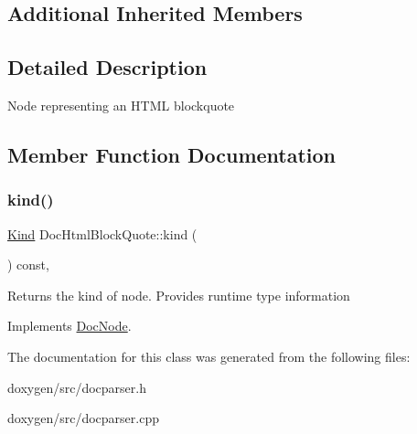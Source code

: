 \subsection*{Additional Inherited Members}


\subsection{Detailed Description}
Node representing an H\+T\+ML blockquote 

\subsection{Member Function Documentation}
\mbox{\label{class_doc_html_block_quote_abed6e9fd631d3e7b7cf1b2330dc96677}} 
\subsubsection{\texorpdfstring{kind()}{kind()}}
{\footnotesize\ttfamily \mbox{\hyperlink{class_doc_node_aebd16e89ca590d84cbd40543ea5faadb}{Kind}} Doc\+Html\+Block\+Quote\+::kind (\begin{DoxyParamCaption}{ }\end{DoxyParamCaption}) const\hspace{0.3cm}{\ttfamily [inline]}, {\ttfamily [virtual]}}

Returns the kind of node. Provides runtime type information 

Implements \mbox{\hyperlink{class_doc_node_a108ffd214a72ba6e93dac084a8f58049}{Doc\+Node}}.



The documentation for this class was generated from the following files\+:\begin{DoxyCompactItemize}
\item 
doxygen/src/docparser.\+h\item 
doxygen/src/docparser.\+cpp\end{DoxyCompactItemize}

